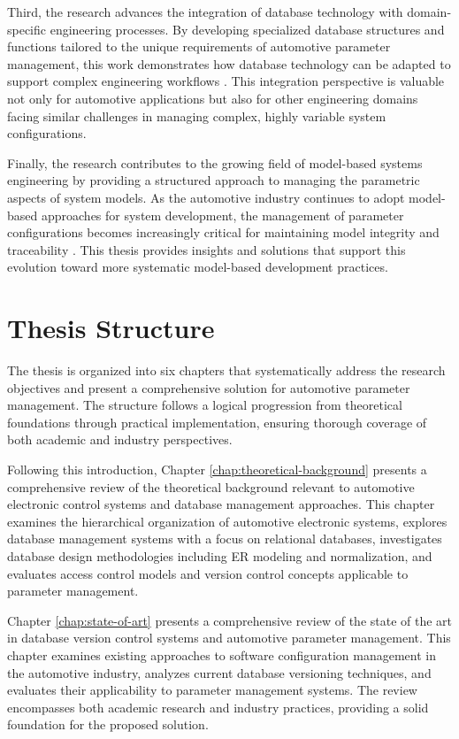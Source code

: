 Third, the research advances the integration of database technology with domain-specific engineering processes. By developing specialized database structures and functions tailored to the unique requirements of automotive parameter management, this work demonstrates how database technology can be adapted to support complex engineering workflows \cite{elmasri2015fundamentals}. This integration perspective is valuable not only for automotive applications but also for other engineering domains facing similar challenges in managing complex, highly variable system configurations.

Finally, the research contributes to the growing field of model-based systems engineering by providing a structured approach to managing the parametric aspects of system models. As the automotive industry continues to adopt model-based approaches for system development, the management of parameter configurations becomes increasingly critical for maintaining model integrity and traceability \cite{staron2021automotive}. This thesis provides insights and solutions that support this evolution toward more systematic model-based development practices.

\section{Thesis Structure}
\label{sec:structure}

The thesis is organized into six chapters that systematically address the research objectives and present a comprehensive solution for automotive parameter management. The structure follows a logical progression from theoretical foundations through practical implementation, ensuring thorough coverage of both academic and industry perspectives.

Following this introduction, Chapter \ref{chap:theoretical-background} presents a comprehensive review of the theoretical background relevant to automotive electronic control systems and database management approaches. This chapter examines the hierarchical organization of automotive electronic systems, explores database management systems with a focus on relational databases, investigates database design methodologies including \ac{ER} modeling and normalization, and evaluates access control models and version control concepts applicable to parameter management.

Chapter \ref{chap:state-of-art} presents a comprehensive review of the state of the art in database version control systems and automotive parameter management. This chapter examines existing approaches to software configuration management in the automotive industry, analyzes current database versioning techniques, and evaluates their applicability to parameter management systems. The review encompasses both academic research and industry practices, providing a solid foundation for the proposed solution.

